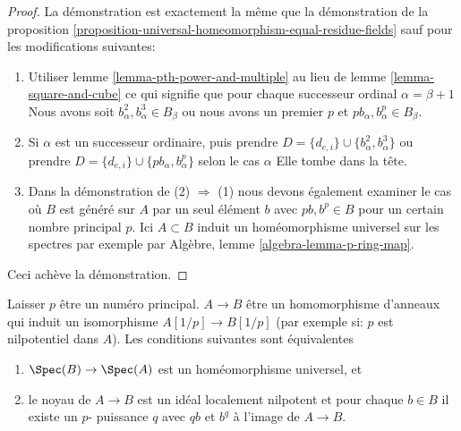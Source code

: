 \begin{proof}

La démonstration est exactement la même que la démonstration de la proposition \ref{proposition-universal-homeomorphism-equal-residue-fields}
sauf pour les modifications suivantes:

\begin{enumerate}

\item Utiliser lemme \ref{lemma-pth-power-and-multiple} au lieu de lemme \ref{lemma-square-and-cube} ce qui signifie que pour chaque successeur ordinal $\alpha = \beta + 1$ Nous avons soit
$b_\alpha^2, b_\alpha^3 \in B_\beta$ ou nous avons un premier $p$ et
$pb_\alpha, b_\alpha^p \in B_\beta$.
\item Si $\alpha$ est un successeur ordinaire, puis prendre
$D = \{d_{e, i}\} \cup \{b_\alpha^2, b_\alpha^3\}$ ou prendre $D = \{d_{e, i}\} \cup \{pb_\alpha, b_\alpha^p\}$ selon le cas $\alpha$ Elle tombe dans la tête.
\item Dans la démonstration de (2) $\Rightarrow$ (1) nous devons également examiner le cas où $B$ est généré sur $A$ par un seul élément $b$
avec $pb, b^p \in B$ pour un certain nombre principal $p$. Ici $A \subset B$
induit un homéomorphisme universel sur les spectres par exemple par Algèbre, lemme \ref{algebra-lemma-p-ring-map}.

\end{enumerate}

Ceci achève la démonstration.

\end{proof}

\begin{lemma}

\label{lemma-universal-homeo-iso-if-invert-p}

Laisser $p$ être un numéro principal. $A \to B$ être un homomorphisme d'anneaux qui induit un isomorphisme $A[1/p] \to B[1/p]$
(par exemple si: $p$ est nilpotentiel dans $A$). Les conditions suivantes sont équivalentes

\begin{enumerate}

\item  $\Spec(B) \to \Spec(A)$ est un homéomorphisme universel, et
\item le noyau de $A \to B$ est un idéal localement nilpotent et pour chaque $b \in B$ il existe un $p$- puissance $q$ avec $qb$ et $b^q$
à l'image de $A \to B$.

\end{enumerate}

\end{lemma}

